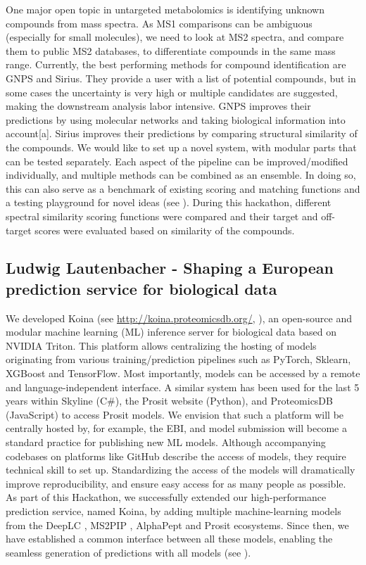 One major open topic in untargeted metabolomics is identifying unknown compounds from mass spectra. As MS1 comparisons can be ambiguous (especially for small molecules), we need to look at MS2 spectra, and compare them to public MS2 databases, to differentiate compounds in the same mass range. Currently, the best performing methods for compound identification are GNPS and Sirius. They provide a user with a list of potential compounds, but in some cases the uncertainty is very high or multiple candidates are suggested, making the downstream analysis labor intensive. GNPS improves their predictions by using molecular networks and taking biological information into account[a]. Sirius improves their predictions by comparing structural similarity of the compounds. We would like to set up a novel system, with modular parts that can be tested separately. Each aspect of the pipeline can be improved/modified individually, and multiple methods can be combined as an ensemble. In doing so, this can also serve as a benchmark of existing scoring and matching functions and a testing playground for novel ideas (see \citep{issue13}).
During this hackathon, different spectral similarity scoring functions were compared and their target and off-target scores were evaluated based on similarity of the compounds.

\subsection{Ludwig Lautenbacher - Shaping a European prediction service for biological data}

We developed Koina (see \url{http://koina.proteomicsdb.org/}, \citep{Lautenbacher2024}), an open-source and modular machine learning (ML) inference server for biological data based on NVIDIA Triton. This platform allows centralizing the hosting of models originating from various training/prediction pipelines such as PyTorch, Sklearn, XGBoost and TensorFlow. Most importantly, models can be accessed by a remote and language-independent interface. A similar system has been used for the last 5 years within Skyline (C\#), the Prosit website (Python), and ProteomicsDB (JavaScript) to access Prosit models. We envision that such a platform will be centrally hosted by, for example, the EBI, and model submission will become a standard practice for publishing new ML models. Although accompanying codebases on platforms like GitHub describe the access of models, they require technical skill to set up. Standardizing the access of the models will dramatically improve reproducibility, and ensure easy access for as many people as possible.
As part of this Hackathon, we successfully extended our high-performance prediction service, named Koina, by adding multiple machine-learning models from the DeepLC \citep{pmid34711972}, MS2PIP \citep{pmid24078703, pmid25990723}, AlphaPept \citep{pmid36433986} and Prosit \citep{pmid31133760, pmid35549156, pmid34099720} ecosystems. Since then, we have established a common interface between all these models, enabling the seamless generation of predictions with all models (see \citep{issue12}).


